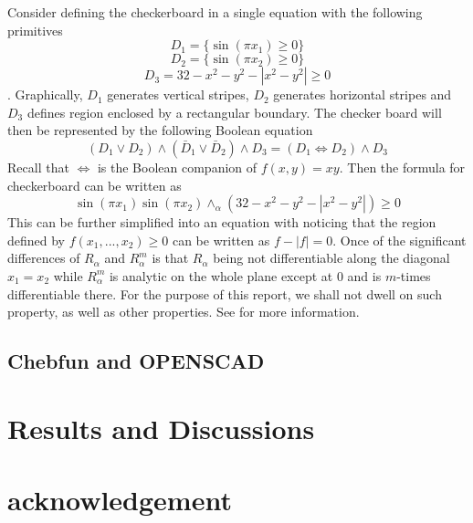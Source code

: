 \documentclass[12pt]{amsart}
\begin{document}
Consider defining the checkerboard in a single equation with the following primitives 
$$D_1=\{\sin(\pi x_1)\geq 0\}$$
$$D_2=\{\sin(\pi x_2)\geq 0\}$$
$$D_3=32-x^2-y^2-|x^2-y^2|\geq 0$$. 
Graphically, $D_1$ generates vertical stripes, $D_2$ generates horizontal stripes and $D_3$ defines region enclosed by a rectangular boundary. The checker board will then be represented by the following Boolean equation
$$(D_1\vee D_2)\wedge (\bar{D}_1\vee \bar{D}_2)\wedge D_3=(D_1\Leftrightarrow D_2)\wedge D_3$$
Recall that $\Leftrightarrow$ is the Boolean companion of $f(x,y)=xy$. Then the formula for checkerboard can be written as 
$$\sin(\pi x_1)\sin(\pi x_2) \wedge_\alpha (32-x^2-y^2-|x^2-y^2|) \geq 0$$
This can be further simplified into an equation with noticing that the region defined by $f(x_1,...,x_2)\geq 0$ can be written as $f-|f|= 0$. Once of the significant differences of $R_\alpha$ and $R_{\alpha}^{m}$ is that $R_\alpha$ being not differentiable along the diagonal $x_1=x_2$ while $R_{\alpha}^m$ is analytic on the whole plane except at $0$ and is $m$-times differentiable there. For the purpose of this report, we shall not dwell on such property, as well as other properties. See for more information. 
\subsection{Chebfun and OPENSCAD}
\section{Results and Discussions}
\section{acknowledgement}
\end{document}
